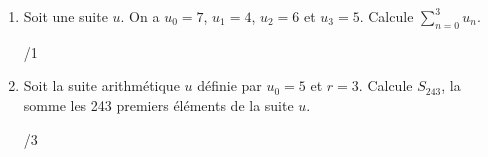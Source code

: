 \begin{enumerate}
		\item 
			\begin{minipage}[t]{.9\textwidth}
				Soit une suite $u$. On a $u_0 = 7$, $u_1=4$, $u_2 = 6$ et $u_3 = 5$. Calcule $\sum_{n=0}^{3} u_n$.
			\end{minipage}%
			\begin{minipage}{.1\textwidth}
				\begin{flushright}
					{\large /1}
				\end{flushright}
			\end{minipage}
			\vspace{3em}
			
		\item 
			\begin{minipage}[t]{.9\textwidth}
				Soit la suite arithmétique $u$ définie par $u_0 = 5$ et $r = 3$. Calcule $S_{243}$, la somme les 243 premiers éléments de la suite $u$.
			\end{minipage}%
			\begin{minipage}{.1\textwidth}
				\begin{flushright}
					{\large /3}
				\end{flushright}
			\end{minipage}
			\vspace{3em}
	\end{enumerate}
	
